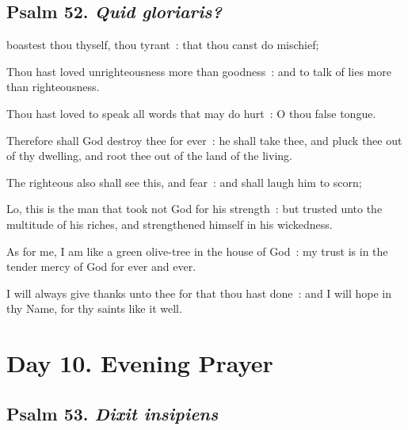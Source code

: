 \subsection{Psalm 52. \textit{Quid gloriaris?}}

 boastest thou thyself, thou tyrant~: that thou canst do mischief;\par
{}
Thou hast loved unrighteousness more than goodness~: and to talk of lies more than righteousness.\par
{}Thou hast loved to speak all words that may do hurt~: O thou false tongue.\par
{}Therefore shall God destroy thee for ever~: he shall take thee, and pluck thee out of thy dwelling, and root thee out of the land of the living.\par
{}The righteous also shall see this, and fear~: and shall laugh him to scorn;\par
{}Lo, this is the man that took not God for his strength~: but trusted unto the multitude of his riches, and strengthened himself in his wickedness.\par
{}As for me, I am like a green olive-tree in the house of God~: my trust is in the tender mercy of God for ever and ever.\par
{}I will always give thanks unto thee for that thou hast done~: and I will hope in thy Name, for thy saints like it well.\par

\section*{Day 10. Evening Prayer}

\subsection{Psalm 53. \textit{Dixit insipiens}}

